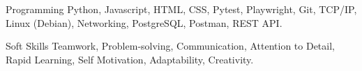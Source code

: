 

\begin{cvskills}

  \cvskill
    {Programming} %
    {Python, Javascript, HTML, CSS, Pytest, Playwright, Git, TCP/IP, Linux (Debian), Networking, PostgreSQL, Postman, REST API.} %

  \cvskill
    {Soft Skills} %
    {Teamwork, Problem-solving, Communication, Attention to Detail, Rapid Learning, Self Motivation, Adaptability, Creativity.} %

\end{cvskills}
